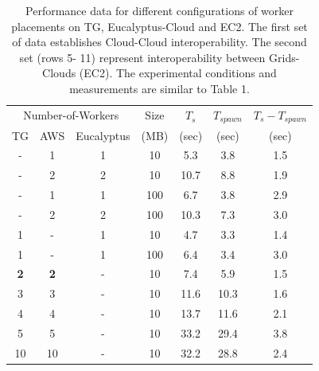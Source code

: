 \documentclass[conference,final]{IEEEtran}
\newcommand{\upp}{\vspace*{-0.6em}}
\begin{document}
\begin{table}
\upp
\begin{tabular}{ccccccc}
  \hline
  \multicolumn{3}{c}{Number-of-Workers}  &  Size   &  $T_s$  & $T_{spawn}$ & $T_s - T_{spawn}$\\   
  TG &  AWS & Eucalyptus &  (MB)  & (sec) & (sec) & (sec) \\
  \hline
  - & 1 & 1 & 10   & 5.3 & 3.8 & 1.5\\
  - & 2 & 2 & 10   & 10.7 & 8.8 & 1.9 \\
  - & 1 & 1 & 100  & 6.7 & 3.8 & 2.9\\
  - & 2 & 2 & 100  & 10.3 & 7.3 & 3.0\\
  \hline 
  1 & - & 1 & 10   & 4.7 & 3.3 & 1.4\\
  1 & - & 1 & 100  & 6.4 & 3.4 & 3.0\\
  \hline 
  {\bf 2} &   {\bf 2} & - & 10 & 7.4 & 5.9 & 1.5 \\
  3 & 3 & - & 10 & 11.6 & 10.3 & 1.6 \\
  4 & 4 & - & 10 & 13.7 & 11.6 & 2.1 \\
  5 & 5 & - & 10 & 33.2 & 29.4 & 3.8 \\ 
  10 & 10 & - & 10 & 32.2 & 28.8 & 2.4 \\
  \hline
   \hline 
\end{tabular}
\upp
\caption{Performance data for different configurations of worker placements
  on TG, Eucalyptus-Cloud and EC2. The first set of data
  establishes Cloud-Cloud interoperability. The second set 
  (rows 5- 11) represent  interoperability between Grids-Clouds (EC2). 
  The experimental conditions and measurements are similar to Table 1.\vspace*{-1em}}
\label{stuff-2}
\upp
\upp
\end{table}
\end{document}
